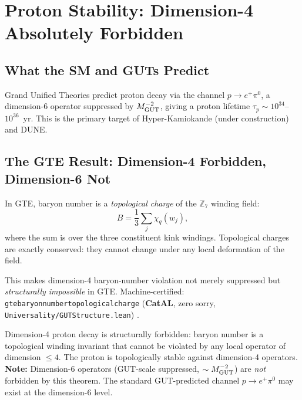 \documentclass[11pt,a4paper]{article}
\newcommand{\lean}[1]{%
  \penalty-100
  \begingroup\def\_{\textunderscore\allowbreak}\texttt{#1}\endgroup}
\newcommand{\CatAL}{\textbf{CatAL}}
\begin{document}
\section{Proton Stability: Dimension-4 Absolutely Forbidden}
\label{sec:proton}

\subsection{What the SM and GUTs Predict}

Grand Unified Theories predict proton decay via the channel
$p \to e^+ \pi^0$, a dimension-6 operator suppressed by $M_{\rm GUT}^{-2}$,
giving a proton lifetime $\tau_p \sim 10^{34}$--$10^{36}$~yr.
This is the primary target of Hyper-Kamiokande (under construction) and DUNE.

\subsection{The GTE Result: Dimension-4 Forbidden, Dimension-6 Not}

In GTE, baryon number is a \emph{topological charge} of the $\mathbb{Z}_7$
winding field:
\begin{equation}
  B = \frac{1}{3}\sum_j \chi_q(w_j),
\end{equation}
where the sum is over the three constituent kink windings.  Topological charges
are exactly conserved: they cannot change under any local deformation of the
field.

This makes dimension-4 baryon-number violation not merely suppressed but
\emph{structurally impossible} in GTE.  Machine-certified:
\lean{gte\_baryon\_number\_topological\_charge}
(\CatAL, zero sorry, \texttt{Universality/GUTStructure.lean})
\cite{SpivackGTECompleteFramework}.

\begin{tcolorbox}[colback=boxgreen,colframe=green!50!black,
  title={Proton Stability Theorem (\CatAL)}]
Dimension-4 proton decay is structurally forbidden: baryon number is a
topological winding invariant that cannot be violated by any local operator of
dimension $\leq 4$.  The proton is topologically stable against dimension-4
operators.\\[4pt]
\textbf{Note:} Dimension-6 operators (GUT-scale suppressed, $\sim M_{\rm GUT}^{-2}$)
are \emph{not} forbidden by this theorem.  The standard GUT-predicted channel
$p \to e^+ \pi^0$ may exist at the dimension-6 level.
\end{tcolorbox}
\end{document}
